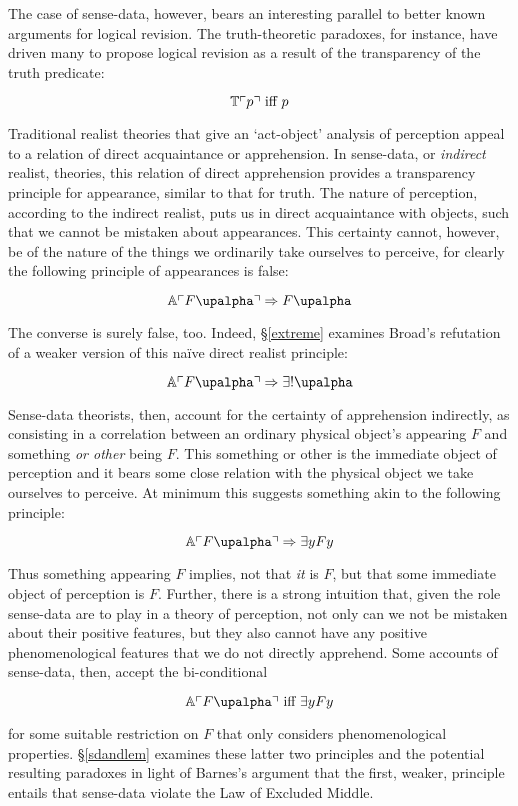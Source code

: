 The case of sense-data, however, bears an interesting parallel to better known arguments for logical revision. The truth-theoretic paradoxes, for instance, have driven many to propose logical revision as a result of the transparency of the truth predicate:

\[\mathbb{T}\ulcorner p\urcorner \mbox{ iff } p\]

\noindent Traditional realist theories that give an `act-object' analysis of perception appeal to a relation of direct acquaintance or apprehension. In sense-data, or \emph{indirect} realist, theories, this relation of direct apprehension provides a transparency principle for appearance, similar to that for truth. The nature of perception, according to the indirect realist, puts us in direct acquaintance with objects, such that we cannot be mistaken about appearances. This certainty cannot, however, be of the nature of the things we ordinarily take ourselves to perceive, for clearly the following principle of appearances is false:

\[\Appears{F\upalpha}\then F\upalpha\]

\noindent The converse is surely false, too. Indeed, \S\ref{extreme} examines Broad's refutation of a weaker version of this na\"{i}ve direct realist principle:

\[\Appears{F\upalpha}\then \exists ! \upalpha \]

Sense-data theorists, then, account for the certainty of apprehension indirectly, as consisting in a correlation between an ordinary physical object's appearing $F$ and something \emph{or other} being $F$. This something or other is the immediate object of perception and it bears some close relation with the physical object we take ourselves to perceive. At minimum this suggests something akin to the following principle:

\[\Appears{F\upalpha}\then \exists y Fy \]

\noindent Thus something appearing $F$ implies, not that \emph{it} is $F$, but that some immediate object of perception is $F$. Further, there is a strong intuition that, given the role sense-data are to play in a theory of perception, not only can we not be mistaken about their positive features, but they also cannot have any positive phenomenological features that we do not directly apprehend. Some accounts of sense-data, then, accept the bi-conditional

\[\Appears{F\upalpha}\iff \exists y Fy \]

\noindent for some suitable restriction on $F$ that only considers phenomenological properties. \S\ref{sdandlem} examines these latter two principles and the potential resulting paradoxes in light of Barnes's argument that the first, weaker, principle entails that sense-data violate the Law of Excluded Middle. 

